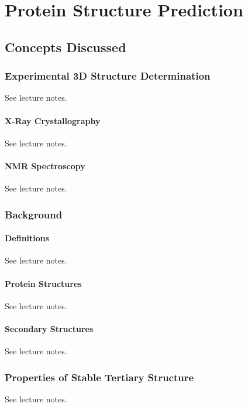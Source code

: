 
\chapter{Protein Structure Prediction} 

\label{Chapter7} 

\section{Concepts Discussed}

    \subsection{Experimental 3D Structure Determination}
    See lecture notes.\autocite{T7}

        \subsubsection{X-Ray Crystallography}
        See lecture notes.\autocite{T7}

        \subsubsection{NMR Spectroscopy}
        See lecture notes.\autocite{T7}

    \subsection{Background}

        \subsubsection{Definitions}
        See lecture notes.\autocite{T7}

        \subsubsection{Protein Structures}
        See lecture notes.\autocite{T7}

        \subsubsection{Secondary Structures}
        See lecture notes.\autocite{T7}

    \subsection{Properties of Stable Tertiary Structure}
    See lecture notes.\autocite{T7}

